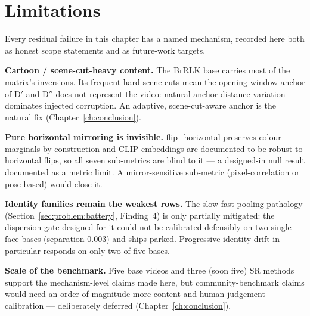\section{Limitations}
\label{sec:exp:limitations}

Every residual failure in this chapter has a named mechanism, recorded here
both as honest scope statements and as future-work targets.

\textbf{Cartoon / scene-cut-heavy content.} The BrRLK base carries most of
the matrix's inversions. Its frequent hard scene cuts mean the opening-window
anchor of D$'$ and D$''$ does not represent the video: natural
anchor-distance variation dominates injected corruption. An adaptive,
scene-cut-aware anchor is the natural fix
(Chapter~\ref{ch:conclusion}).

\textbf{Pure horizontal mirroring is invisible.} flip\_horizontal preserves
colour marginals by construction and CLIP embeddings are documented to be
robust to horizontal flips, so all seven sub-metrics are blind to it --- a
designed-in null result documented as a metric limit. A mirror-sensitive
sub-metric (pixel-correlation or pose-based) would close it.

\textbf{Identity families remain the weakest rows.} The slow-fast pooling
pathology (Section~\ref{sec:problem:battery}, Finding~4) is only partially
mitigated: the dispersion gate designed for it could not be calibrated
defensibly on two single-face bases (separation $0.003$) and ships parked.
Progressive identity drift in particular responds on only two of five bases.

\textbf{Scale of the benchmark.} Five base videos and three (soon five) SR
methods support the mechanism-level claims made here, but community-benchmark
claims would need an order of magnitude more content and human-judgement
calibration --- deliberately deferred (Chapter~\ref{ch:conclusion}).
